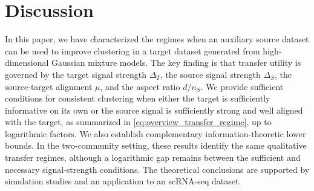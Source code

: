 \documentclass[10pt]{article}
\newcommand{\trg}{T}
\newcommand{\DeltaT}{\Delta_{\trg}}
\newcommand{\src}{S}
\newcommand{\nS}{n_{\src}}
\newcommand{\DeltaS}{\Delta_{\src}}
\begin{document}

\section{Discussion}
\label{sec:discussion}

In this paper, we have characterized the regimes when an auxiliary source dataset can be used to improve clustering in a target dataset generated from
high-dimensional Gaussian mixture models. The key finding is that transfer
utility is governed by the target signal strength $\DeltaT$, the source
signal strength $\DeltaS$, the source-target alignment $\mu$, and the aspect ratio
$d/\nS$. We provide sufficient conditions for consistent clustering when either the target is sufficiently informative on its own or the source signal is sufficiently strong and well aligned with the target, as summarized in \eqref{eq:overview_transfer_regime}, up to logarithmic factors. We also establish complementary information-theoretic lower bounds. In the two-community setting, these results identify the same qualitative transfer regimes, although a logarithmic gap remains between the sufficient and necessary signal-strength conditions. The theoretical conclusions are supported by simulation studies and an application to an scRNA-seq dataset.
\end{document}
